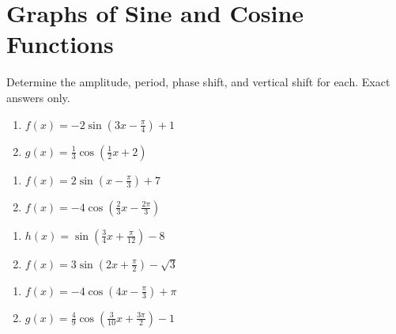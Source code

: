 \chapter{Graphs of Sine and Cosine Functions}

Determine the amplitude, period, phase shift, and vertical shift for each. Exact answers only.

\begin{multicols}{2}
\begin{enumerate}
	\item $f(x) = -2\sin\left(3x-\frac{\pi}{4}\right) + 1$
	\item $g(x) = \frac{1}{3}\cos\left(\frac{1}{2}x + 2\right)$
\end{enumerate}	\setcounter{Review}{\value{enumi}}
\end{multicols}
\begin{multicols}{2}
\begin{enumerate}	\setcounter{enumi}{\value{Review}}
	\item $f(x)=2\sin\left(x-\frac{\pi}{3}\right)+7$
	\item $f(x)=-4\cos\left(\frac{2}{3}x-\frac{2\pi}{3}\right)$
\end{enumerate}	\setcounter{Review}{\value{enumi}}
\end{multicols}
\begin{multicols}{2}
\begin{enumerate}	\setcounter{enumi}{\value{Review}}
	\item $h(x) = \sin\left(\frac{3}{4}x + \frac{\pi}{12}\right) - 8$
	\item $f(x)=3\sin\left(2x+\frac{\pi}{2}\right)-\sqrt{3}$
\end{enumerate}	\setcounter{Review}{\value{enumi}}
\end{multicols}
\begin{multicols}{2}
\begin{enumerate}	\setcounter{enumi}{\value{Review}}
	\item $f(x) = -4\cos\left(4x-\frac{\pi}{3}\right) + \pi$
	\item $g(x) = \frac{4}{9}\cos\left(\frac{3}{10}x + \frac{3\pi}{2}\right) - 1$
\end{enumerate}
\setcounter{Review}{\value{enumi}}
\end{multicols}
\bigskip

